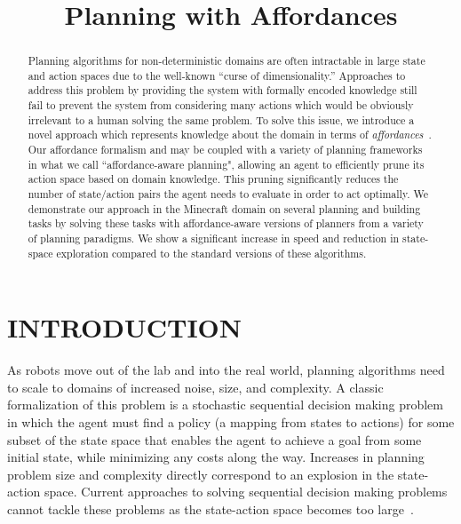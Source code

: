 \documentclass[]{article}
\title{Planning with Affordances}
\newcommand{\stnote}[1]{\textcolor{Blue}{\textbf{ST: #1}}}
\begin{document}
\author{}
\maketitle

\begin{abstract}

Planning algorithms for non-deterministic domains are often
intractable in large state and action spaces due to the well-known
``curse of dimensionality.''  Approaches to address this problem by
providing the system with formally encoded knowledge still fail to 
prevent the system from considering many actions which would 
be obviously irrelevant to a human solving the same problem.  
To solve this issue, we introduce a novel approach which represents 
knowledge about the domain in terms of {\em affordances}~\citep{gibson77}.  
Our affordance formalism and may be coupled with a variety of planning 
frameworks in what we call  ``affordance-aware planning", allowing an 
agent to efficiently prune  its action space based on domain knowledge.  
This pruning significantly  reduces the number of state/action pairs the 
agent needs to evaluate in order to act optimally. We demonstrate our 
approach in the Minecraft domain on several planning and building tasks
by solving these tasks with affordance-aware versions of planners from a variety of planning paradigms.
We show a significant increase in speed and reduction in state-space exploration
compared to the standard versions of these algorithms.

\end{abstract}


\section{INTRODUCTION}

As robots move out of the lab and into the real world, planning
algorithms need to scale to domains of increased noise, size, and
complexity.  A classic formalization of this problem is a stochastic
sequential decision making problem in which the agent must find a
policy (a mapping from states to actions) for some subset of the state
space that enables the agent to achieve a goal from some initial
state, while minimizing any costs along the way.
Increases in planning problem size
and complexity directly correspond to an explosion in the state-action
space. Current approaches to solving sequential decision making
problems cannot tackle these problems as the state-action space
becomes too large~\citep{grounds05}.
\end{document}
